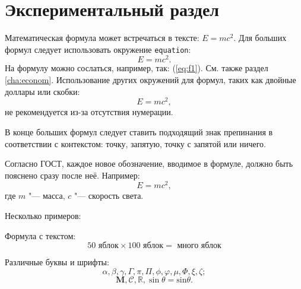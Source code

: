 \chapter{Экспериментальный раздел}
\label{cha:research}

Математическая формула может встречаться в тексте: $E = mc^2$. Для больших формул следует использовать окружение \verb|equation|:
\begin{equation}\label{eq:f1}
    E = mc^2.
\end{equation}
На формулу можно сослаться, например, так: (\ref{eq:f1}). См. также раздел \ref{cha:econom}. Использование других окружений для формул, таких как двойные доллары или скобки:
\[
    E = mc^2,
\]
не рекомендуется из-за отсутствия нумерации.

В конце больших формул следует ставить подходящий знак препинания в соответствии с контекстом: точку, запятую, точку с запятой или ничего.

Согласно ГОСТ, каждое новое обозначение, вводимое в формуле, должно быть пояснено сразу после неё. Например:
\begin{equation}
    E = mc^2,
\end{equation}
где $m$ "--- масса, $c$ "--- скорость света.

Несколько примеров:

Формула с текстом:
\begin{equation}
    50 \text{ яблок} \times 100 \text{ яблок} =
    \textbf{ много яблок}
\end{equation}

Различные буквы и шрифты:
\begin{equation}
    \alpha,  \beta,  \gamma, \Gamma, \pi, \Pi, \phi, \varphi, \mu, \Phi, \xi, \zeta;
\end{equation}
\begin{equation}
    \mathbf M, \mathcal C, \mathbb R, \sin \theta = \mathrm{sin} \theta.
\end{equation}

